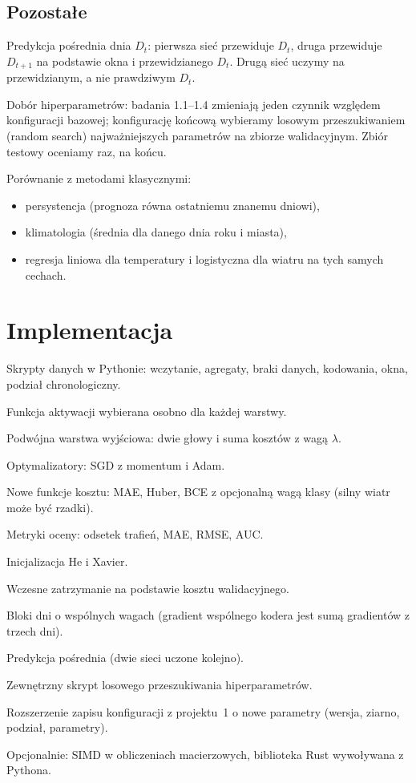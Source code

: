 \documentclass{article}
\begin{document}
\subsection{Pozostałe}
\begin{badania}
  \item Predykcja pośrednia dnia $D_t$: pierwsza sieć przewiduje $D_t$, druga przewiduje $D_{t+1}$
    na podstawie okna i przewidzianego $D_t$. Drugą sieć uczymy na przewidzianym, a nie prawdziwym $D_t$.
  \item Dobór hiperparametrów: badania 1.1--1.4 zmieniają jeden czynnik względem konfiguracji bazowej;
    konfigurację końcową wybieramy losowym przeszukiwaniem (random search) najważniejszych parametrów na zbiorze walidacyjnym.
    Zbiór testowy oceniamy raz, na końcu.
  \item Porównanie z metodami klasycznymi:
    \begin{itemize}
      \item persystencja (prognoza równa ostatniemu znanemu dniowi),
      \item klimatologia (średnia dla danego dnia roku i miasta),
      \item regresja liniowa dla temperatury i logistyczna dla wiatru na tych samych cechach.
    \end{itemize}
\end{badania}

\section{Implementacja}
\begin{punkty}
  \item Skrypty danych w Pythonie: wczytanie, agregaty, braki danych, kodowania, okna, podział chronologiczny.
  \item Funkcja aktywacji wybierana osobno dla każdej warstwy.
  \item Podwójna warstwa wyjściowa: dwie głowy i suma kosztów z wagą $\lambda$.
  \item Optymalizatory: SGD z momentum i Adam.
  \item Nowe funkcje kosztu: MAE, Huber, BCE z opcjonalną wagą klasy (silny wiatr może być rzadki).
  \item Metryki oceny: odsetek trafień, MAE, RMSE, AUC.
  \item Inicjalizacja He i Xavier.
  \item Wczesne zatrzymanie na podstawie kosztu walidacyjnego.
  \item Bloki dni o wspólnych wagach (gradient wspólnego kodera jest sumą gradientów z trzech dni).
  \item Predykcja pośrednia (dwie sieci uczone kolejno).
  \item Zewnętrzny skrypt losowego przeszukiwania hiperparametrów.
  \item Rozszerzenie zapisu konfiguracji z projektu~1 o nowe parametry (wersja, ziarno, podział, parametry).
  \item Opcjonalnie: SIMD w obliczeniach macierzowych, biblioteka Rust wywoływana z Pythona.
\end{punkty}
\end{document}
